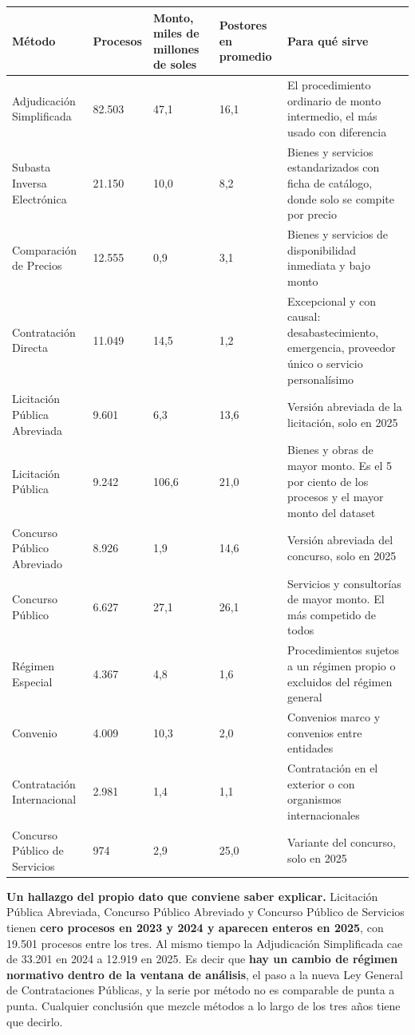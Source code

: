 \documentclass[11pt]{article}
\begin{document}
\begin{center}\footnotesize
\begin{tabularx}{\linewidth}{Q{0.795}Q{0.940}Q{0.940}Q{0.940}Q{1.386}}
\toprule
\textbf{Método} & \textbf{Procesos} & \textbf{Monto, miles de millones de soles} & \textbf{Postores en promedio} & \textbf{Para qué sirve} \\
\midrule
Adjudicación Simplificada & 82.503 & 47,1 & 16,1 & El procedimiento ordinario de monto intermedio, el más usado con diferencia \\
Subasta Inversa Electrónica & 21.150 & 10,0 & 8,2 & Bienes y servicios estandarizados con ficha de catálogo, donde solo se compite por precio \\
Comparación de Precios & 12.555 & 0,9 & 3,1 & Bienes y servicios de disponibilidad inmediata y bajo monto \\
Contratación Directa & 11.049 & 14,5 & 1,2 & Excepcional y con causal: desabastecimiento, emergencia, proveedor único o servicio personalísimo \\
Licitación Pública Abreviada & 9.601 & 6,3 & 13,6 & Versión abreviada de la licitación, solo en 2025 \\
Licitación Pública & 9.242 & 106,6 & 21,0 & Bienes y obras de mayor monto. Es el 5 por ciento de los procesos y el mayor monto del dataset \\
Concurso Público Abreviado & 8.926 & 1,9 & 14,6 & Versión abreviada del concurso, solo en 2025 \\
Concurso Público & 6.627 & 27,1 & 26,1 & Servicios y consultorías de mayor monto. El más competido de todos \\
Régimen Especial & 4.367 & 4,8 & 1,6 & Procedimientos sujetos a un régimen propio o excluidos del régimen general \\
Convenio & 4.009 & 10,3 & 2,0 & Convenios marco y convenios entre entidades \\
Contratación Internacional & 2.981 & 1,4 & 1,1 & Contratación en el exterior o con organismos internacionales \\
Concurso Público de Servicios & 974 & 2,9 & 25,0 & Variante del concurso, solo en 2025 \\
\bottomrule
\end{tabularx}
\end{center}
\textbf{Un hallazgo del propio dato que conviene saber explicar.} Licitación Pública Abreviada, Concurso Público Abreviado y Concurso Público de Servicios tienen \textbf{cero procesos en 2023 y 2024 y aparecen enteros en 2025}, con 19.501 procesos entre los tres. Al mismo tiempo la Adjudicación Simplificada cae de 33.201 en 2024 a 12.919 en 2025. Es decir que \textbf{hay un cambio de régimen normativo dentro de la ventana de análisis}, el paso a la nueva Ley General de Contrataciones Públicas, y la serie por método no es comparable de punta a punta. Cualquier conclusión que mezcle métodos a lo largo de los tres años tiene que decirlo.
\end{document}

